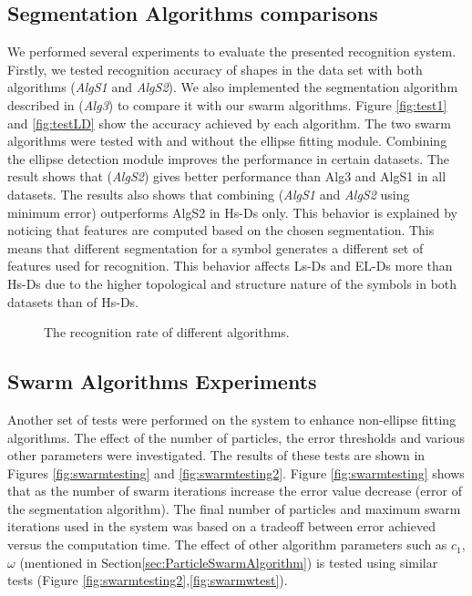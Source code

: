 \documentclass[preprint,1p,times,review]{elsarticle}
\begin{document}
\subsection{Segmentation Algorithms comparisons}
\label{sec:AlgExp}
We performed several experiments to evaluate the presented recognition system. Firstly, we tested recognition accuracy of shapes in the data set with both algorithms (\textsl{AlgS1} and \textsl{AlgS2}). We also implemented the segmentation algorithm described in \cite{earlyprocess} (\textsl{Alg3}) to compare it with our swarm algorithms. Figure \ref{fig:test1} and \ref{fig:testLD} show the accuracy achieved by each algorithm. The two swarm algorithms were tested with and without the ellipse fitting module. Combining the ellipse detection module improves the performance in certain datasets. The result shows that (\textsl{AlgS2}) gives better performance than Alg3 and AlgS1 in all datasets.  The results also shows that combining (\textsl{AlgS1} and \textsl{AlgS2} using minimum error) outperforms AlgS2 in Hs-Ds only. This behavior is explained by noticing that features are computed based on the chosen segmentation. This means that different segmentation for a symbol generates a different set of features used for recognition. This behavior affects Ls-Ds and EL-Ds more than Hs-Ds due to the higher topological and structure nature of the symbols in both datasets than of Hs-Ds.

 \begin{figure}
	\centering
	 	\caption{ The recognition rate of different algorithms. }
 \end{figure}
\subsection{Swarm Algorithms Experiments}
Another set of tests were performed on the system to enhance non-ellipse fitting
algorithms. The effect of the number of particles, the error thresholds and
various other parameters were investigated. The results of these tests are shown
in Figures \ref{fig:swarmtesting} and   \ref{fig:swarmtesting2}. Figure
\ref{fig:swarmtesting} shows that as the number of swarm iterations increase the
error value decrease (error of the segmentation algorithm). The final number of
particles and maximum swarm iterations used in the system was based on a
tradeoff between error achieved versus the computation time. The effect of other
algorithm parameters such as $c_1$, $\omega$ (mentioned in
Section\ref{sec:ParticleSwarmAlgorithm}) is tested using similar tests (Figure
\ref{fig:swarmtesting2},\ref{fig:swarmwtest}).%
\end{document}
